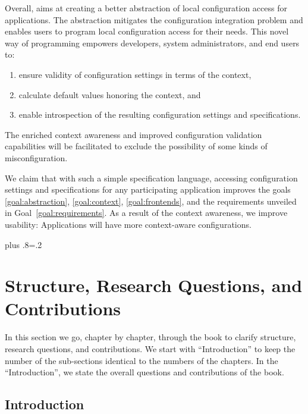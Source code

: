 Overall, \elektra{} aims at creating a better abstraction of local configuration access for applications.
The abstraction mitigates the configuration integration problem and enables users to program local configuration access for their needs.
This novel way of programming empowers developers, system administrators, and end users to:
\begin{enumerate}
 \item ensure validity of configuration settings in terms of the context,
 \item calculate default values honoring the context, and
 \item enable introspection of the resulting configuration settings and specifications.
\end{enumerate}
The enriched context awareness and improved configuration validation capabilities will be facilitated to exclude the possibility of some kinds of misconfiguration.

We claim that with such a simple specification language, accessing configuration settings and specifications for any participating application improves the goals \ref{goal:abstraction}, \ref{goal:context}, \ref{goal:frontends}, and the requirements unveiled in Goal~\ref{goal:requirements}.
As a result of the context awareness, we improve usability:
Applications will have more context-aware configurations.%
{\parfillskip=0pt plus .8\textwidth \emergencystretch=.2\textwidth \par}











\section{Structure, Research Questions, and Contributions}

In this section we go, chapter by chapter, through the book to clarify structure, research questions, and contributions.
We start with ``Introduction'' to keep the number of the sub-sections identical to the numbers of the chapters.
In the ``Introduction'', we state the overall questions and contributions of the book.

\subsection{Introduction}

